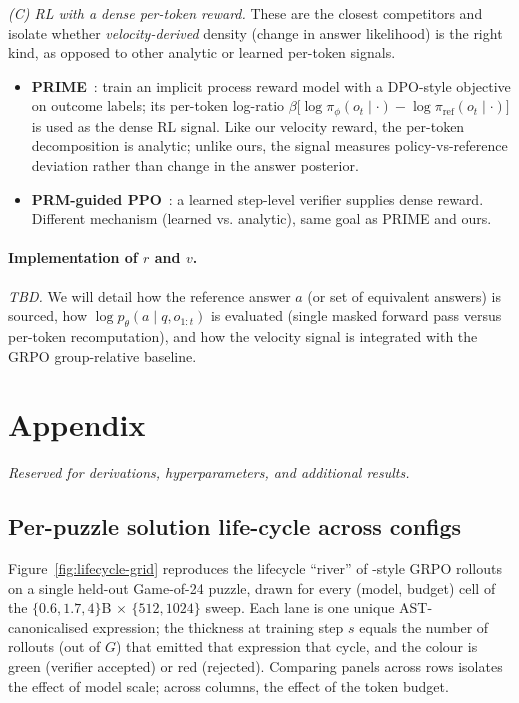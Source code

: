 \documentclass{article}
\begin{document}
\textit{(C) RL with a dense per-token reward.} These are the closest
competitors and isolate whether \emph{velocity-derived} density (change in
answer likelihood) is the right kind, as opposed to other analytic or
learned per-token signals.
\begin{itemize}
  \item \textbf{PRIME}~\citep{cui2025prime}: train an implicit process
        reward model with a DPO-style objective on outcome labels; its
        per-token log-ratio
        \(\beta\bigl[\log\pi_\phi(o_t \mid \cdot) - \log\pi_{\text{ref}}(o_t \mid \cdot)\bigr]\)
        is used as the dense RL signal. Like our velocity reward, the
        per-token decomposition is analytic; unlike ours, the signal
        measures policy-vs-reference deviation rather than change in
        the answer posterior.
  \item \textbf{PRM-guided PPO}~\citep{lightman2023letsverify, wang2024mathshepherd}:
        a learned step-level verifier supplies dense reward. Different
        mechanism (learned vs. analytic), same goal as PRIME and ours.
\end{itemize}

\paragraph{Implementation of \(r\) and \(v\).}
\textit{TBD.} We will detail how the reference answer \(a\) (or set of
equivalent answers) is sourced, how
\(\log p_\theta(a \mid q, o_{1:t})\) is evaluated (single masked forward
pass versus per-token recomputation), and how the velocity signal is
integrated with the GRPO group-relative baseline.




\appendix
\section{Appendix}
\textit{Reserved for derivations, hyperparameters, and additional results.}

\subsection{Per-puzzle solution life-cycle across configs}
\label{app:lifecycle}

Figure~\ref{fig:lifecycle-grid} reproduces the lifecycle ``river'' of
\citet{shao2024deepseekmath}-style GRPO rollouts on a single held-out
Game-of-24 puzzle, drawn for every (model, budget) cell of the
\(\{0.6,1.7,4\}\)B \(\times\) \(\{512, 1024\}\) sweep. Each lane is one
unique AST-canonicalised expression; the thickness at training step
\(s\) equals the number of rollouts (out of \(G\)) that emitted that
expression that cycle, and the colour is green (verifier accepted) or
red (rejected). Comparing panels across rows isolates the effect of
model scale; across columns, the effect of the token budget.
\end{document}
